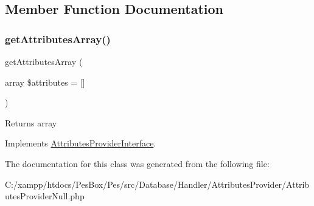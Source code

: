\subsection{Member Function Documentation}
\mbox{\label{class_pes_1_1_database_1_1_handler_1_1_attributes_provider_1_1_attributes_provider_null_a78e4a9edf711d48cd3ec22eaadf560ea}} 
\subsubsection{\texorpdfstring{get\+Attributes\+Array()}{getAttributesArray()}}
{\footnotesize\ttfamily get\+Attributes\+Array (\begin{DoxyParamCaption}\item[{array}]{\$attributes = {\ttfamily \mbox{[}\mbox{]}} }\end{DoxyParamCaption})}

\begin{DoxyReturn}{Returns}
array 
\end{DoxyReturn}


Implements \mbox{\hyperlink{interface_pes_1_1_database_1_1_handler_1_1_attributes_provider_1_1_attributes_provider_interface}{Attributes\+Provider\+Interface}}.



The documentation for this class was generated from the following file\+:\begin{DoxyCompactItemize}
\item 
C\+:/xampp/htdocs/\+Pes\+Box/\+Pes/src/\+Database/\+Handler/\+Attributes\+Provider/Attributes\+Provider\+Null.\+php\end{DoxyCompactItemize}
